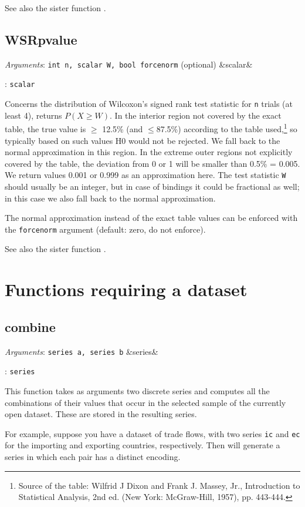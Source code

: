 \documentclass[11pt,english]{article}
\newcommand{\ArgRet}[2]{%
  {\it Arguments}: {#1}%
  \ifx&#2&%
  \else
  \par\smallskip\noindent {\it Return type}: \texttt{#2}
  \fi%
  \par\medskip\par%
  }
\begin{document}
See also the sister function .

\subsection{WSRpvalue}

\ArgRet{\texttt{int n, scalar W, bool forcenorm} (optional)}{scalar}

Concerns the distribution of Wilcoxon's signed rank test statistic for
\texttt{n} trials (at least 4), returns $P(X\geq W)$. In the interior
region not covered by the exact table, the true value is $\geq$ 12.5\%
(and $\leq$87.5\%) according to the table used,\footnote{Source of the
  table: Wilfrid J Dixon and Frank J. Massey, Jr., Introduction to
  Statistical Analysis, 2nd ed. (New York: McGraw-Hill, 1957), pp.
  443-444.} so typically based on such values H0 would not be
rejected. We fall back to the normal approximation in this region. In
the extreme outer regions not explicitly covered by the table, the
deviation from 0 or 1 will be smaller than 0.5\% = 0.005. We return
values 0.001 or 0.999 as an approximation here. The test statistic
\texttt{W} should usually be an integer, but in case of bindings it
could be fractional as well; in this case we also fall back to the
normal approximation.

The normal approximation instead of the exact table values can be
enforced with the \texttt{forcenorm} argument (default: zero, do not
enforce).

See also the sister function .


\section{Functions requiring a dataset}

\subsection{combine}

\ArgRet{\texttt{series a, series b}}{series}

This function takes as arguments two discrete series and computes all
the combinations of their values that occur in the selected sample of
the currently open dataset. These are stored in the resulting series.

For example, suppose you have a dataset of trade flows, with two
series \texttt{ic} and \texttt{ec} for the importing and exporting
countries, respectively. Then  will generate a
series in which each pair has a distinct encoding.
\end{document}
